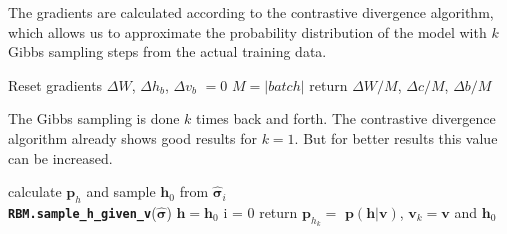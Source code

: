 \documentclass[submission, Phys]{SciPost}
\begin{document}

The gradients are calculated according to the contrastive divergence algorithm, which allows us to approximate the probability distribution of the model with $k$ Gibbs sampling steps from the actual training data.

\begin{algorithm}[H]
	 \caption{Compute Gradient from Batch. \textbf{\lstinline{RBM.compute_batch_gradients}}(k, batch) }
  \SetAlgoLined
  Reset gradients $\Delta W$, $\Delta h_b$, $\Delta v_b$ $= 0$\;
 $M = \vert batch \vert$ \;
 return $\Delta W / M$,  $\Delta c / M$, $\Delta b / M$
\end{algorithm}


The Gibbs sampling is done $k$ times back and forth. The contrastive divergence algorithm already shows good results for $k=1$. But for better results this value can be increased.

\begin{algorithm}[H]
	 \caption{Gibbs sampling. \textbf{\lstinline{RBM.gibbs_sampling}}(k, $\hat{ \boldsymbol{ \sigma}}_i$) }
  \SetAlgoLined
  calculate $\bm{p}_h$ and sample $\bm{h}_0$ from $\hat{ \boldsymbol{ \sigma}}_i$\\
  \textbf{\lstinline{RBM.sample_h_given_v}}($\hat{ \boldsymbol{ \sigma}}$)   
  $\bm{h} = \bm{h}_0$\;
  i = 0\;
  return $\bm{p}_{h_k} =$  $\bm{p}(\bm{h}|\bm{v})$, $\bm{v}_k = \bm{v}$ and $\bm{h}_0$\;
 
\end{algorithm}
\end{document}
